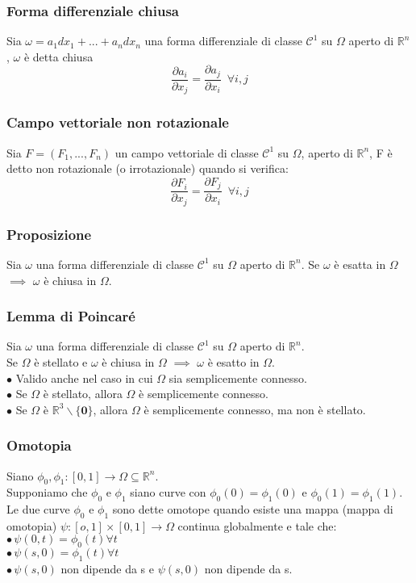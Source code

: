 \documentclass{article} %
\begin{document}
    \subsubsection*{Forma differenziale chiusa}
    Sia $\omega = a_1 dx_1 + ... + a_n dx_n$ una forma differenziale di classe $\mathcal{C} ^1$ su $\Omega$ aperto di $\mathbb{R}^n$, $\omega$ è detta chiusa \\
    $$ \frac{\partial a_i}{ \partial x_j} = \frac{\partial a_j}{\partial x_i} \,\,\, \forall i,j $$

    \subsubsection*{Campo vettoriale non rotazionale}
    Sia $F = (F_1,...,F_n)$ un campo vettoriale di classe $\mathcal{C} ^1$ su $\Omega$, aperto di $\mathbb{R}^n$, F è detto non rotazionale (o irrotazionale) quando si verifica:
    $$\frac{\partial F_i}{ \partial x_j} = \frac{\partial F_j}{\partial x_i} \,\,\, \forall i,j$$

    \subsubsection*{Proposizione}
    Sia $\omega$ una forma differenziale di classe $\mathcal{C}^1$ su $\Omega$ aperto di $\mathbb{R}^n$.
    Se $\omega$ è esatta in $\Omega$ $\implies$ $\omega$ è chiusa in $\Omega$.

    \subsubsection*{Lemma di Poincaré}
    Sia $\omega$ una forma differenziale di classe $\mathcal{C}^1$ su $\Omega$ aperto di $\mathbb{R}^n$. \\
    Se $\Omega$ è stellato e $\omega$ è chiusa in $\Omega$ $\implies$ $\omega$ è esatto in $\Omega$.\\
    $\bullet$ Valido anche nel caso in cui $\Omega$ sia semplicemente connesso. \\
    $\bullet$ Se $\Omega$ è stellato, allora $\Omega$ è semplicemente connesso. \\
    $\bullet$ Se $\Omega$ è $\mathbb{R}^3\backslash \{\mathbf{0}\}$, allora $\Omega$ è semplicemente connesso, ma non è stellato.

    \subsubsection*{Omotopia}
    Siano $\phi_0, \phi_1:[0,1] \to \Omega \subseteq \mathbb{R}^n$. \\ Supponiamo che $\phi_0$ e $\phi_1$ siano curve con $\phi_0(0)=\phi_1(0)$ e $\phi_0(1)=\phi_1(1)$. \\ Le due curve $\phi_0$ e $\phi_1$ sono dette omotope quando esiste una mappa (mappa di omotopia) $\psi:[o,1] \times [0,1] \to \Omega$ continua globalmente e tale che: \\
    $\bullet \, \psi(0,t)=\phi_0(t) \forall t$ \\
    $\bullet \, \psi(s,0)=\phi_1(t) \forall t$ \\
    $\bullet \, \psi(s,0)$ non dipende da s e $\psi(s,0)$ non dipende da s.
\end{document}
